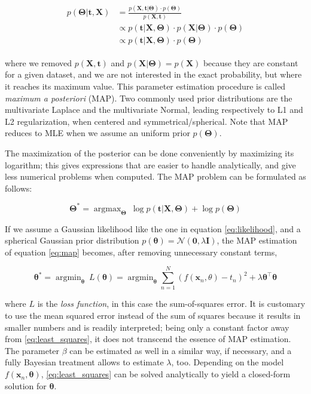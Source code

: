 \documentclass[a4paper]{book}
\DeclareMathOperator*{\argmin}{argmin}
\DeclareMathOperator*{\argmax}{argmax}
\begin{document}
\begin{align}
\begin{split}
\label{eq:map}
p(\bm\Theta\vert\bm t, \bm X)&=\frac{p(\bm X, \bm t\vert\bm\Theta)\cdot p(\bm\Theta)}{p(\bm X, \bm t)}\\
&\propto p(\bm t\vert \bm X,\bm\Theta)\cdot p(\bm X\vert\bm\Theta)\cdot p(\bm\Theta)\\
&\propto p(\bm t\vert \bm X,\bm\Theta)\cdot p(\bm\Theta)
\end{split}
\end{align}


\noindent where we removed $p(\bm X,\bm t)$ and $p(\bm X\vert\bm\Theta)=p(\bm X)$ because they are constant for a given dataset, and we are not interested in the exact probability, but where it reaches its maximum value. This parameter estimation procedure is called \emph{maximum a posteriori} (MAP). Two commonly used prior distributions are the multivariate Laplace and the multivariate Normal, leading respectively to L1 and L2 regularization, when centered and symmetrical/spherical. Note that MAP reduces to MLE when we assume an uniform prior $p(\bm\Theta)$.

The maximization of the posterior can be done conveniently by maximizing its logarithm; this gives expressions that are easier to handle analytically, and give less numerical problems when computed. The MAP problem can be formulated as follows:

\begin{equation}
\bm\Theta^*=\argmax_{\bm\Theta}\ \log p(\bm t\vert\bm X,\bm\Theta)+\log p(\bm\Theta)
\end{equation}


If we assume a Gaussian likelihood like the one in equation \ref{eq:likelihood}, and a spherical Gaussian prior distribution $p(\bm\theta)=\mathcal{N}(\bm 0, \lambda\bm I)$, the MAP estimation of equation \ref{eq:map} becomes, after removing unnecessary constant terms,

\begin{equation}
\label{eq:least_squares}
\bm\theta^*=\argmin_{\bm\theta}\ L(\bm\theta)=\argmin_{\bm\theta}\sum_{n=1}^N\left( f(\bm x_n,\theta)-t_n\right)^2+\lambda\bm\theta^\intercal\bm\theta
\end{equation}

\noindent where $L$ is the \emph{loss function}, in this case the sum-of-squares error. It is customary to use the mean squared error instead of the sum of squares because it results in smaller numbers and is readily interpreted; being only a constant factor away from \ref{eq:least_squares}, it does not transcend the essence of MAP estimation. The parameter $\beta$ can be estimated as well in a similar way, if necessary, and a fully Bayesian treatment allows to estimate $\lambda$, too. Depending on the model $f(\bm x_n,\bm\theta)$, \ref{eq:least_squares} can be solved analytically to yield a closed-form solution for $\bm\theta$.
 
\end{document}
